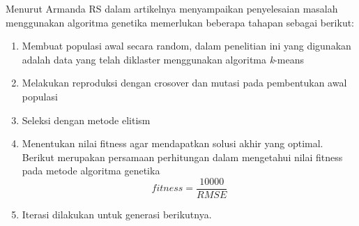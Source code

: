 Menurut Armanda RS \cite{armanda2016penerapan} dalam artikelnya menyampaikan penyelesaian masalah menggunakan algoritma genetika memerlukan beberapa tahapan sebagai berikut:

\begin{enumerate}
	\item Membuat populasi awal secara random, dalam penelitian ini yang digunakan adalah data yang telah diklaster menggunakan algoritma \textit{k}-means
	\item Melakukan reproduksi dengan crosover dan mutasi pada pembentukan awal populasi
	\item Seleksi dengan metode elitism
	\item Menentukan nilai fitness agar mendapatkan solusi akhir yang optimal. Berikut merupakan persamaan perhitungan dalam mengetahui nilai fitness pada metode algoritma genetika
	\begin{equation}
	fitness=\frac{10000}{RMSE}
	\end{equation}
	\item Iterasi dilakukan untuk generasi berikutnya.
\end{enumerate}